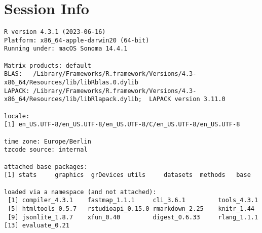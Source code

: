 \documentclass[
  a4paper,
  DIV=11,
  numbers=noendperiod]{scrreprt}
\begin{document}
\cleardoublepage
{}
{}
\appendix

\hypertarget{session-info}{%
\chapter{Session Info}\label{session-info}}

\begin{verbatim}
R version 4.3.1 (2023-06-16)
Platform: x86_64-apple-darwin20 (64-bit)
Running under: macOS Sonoma 14.4.1

Matrix products: default
BLAS:   /Library/Frameworks/R.framework/Versions/4.3-x86_64/Resources/lib/libRblas.0.dylib 
LAPACK: /Library/Frameworks/R.framework/Versions/4.3-x86_64/Resources/lib/libRlapack.dylib;  LAPACK version 3.11.0

locale:
[1] en_US.UTF-8/en_US.UTF-8/en_US.UTF-8/C/en_US.UTF-8/en_US.UTF-8

time zone: Europe/Berlin
tzcode source: internal

attached base packages:
[1] stats     graphics  grDevices utils     datasets  methods   base     

loaded via a namespace (and not attached):
 [1] compiler_4.3.1    fastmap_1.1.1     cli_3.6.1         tools_4.3.1      
 [5] htmltools_0.5.7   rstudioapi_0.15.0 rmarkdown_2.25    knitr_1.44       
 [9] jsonlite_1.8.7    xfun_0.40         digest_0.6.33     rlang_1.1.1      
[13] evaluate_0.21    
\end{verbatim}
\end{document}
